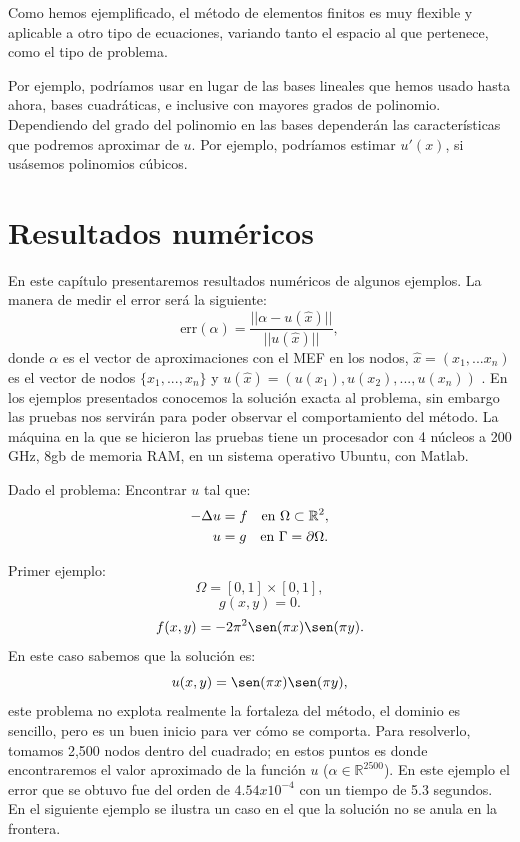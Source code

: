 \documentclass[12pt,spanish,oneside]{book}
\theoremstyle{plain}
\numberwithin{equation}{chapter}
\theoremstyle{definition}
\theoremstyle{remark}
\newcommand{\re}{\mathbb{R}}
\begin{document}
Como hemos ejemplificado, el método de elementos finitos es muy flexible y aplicable a otro tipo de ecuaciones, variando tanto el espacio al que pertenece, como el tipo de problema. 

Por ejemplo, podríamos usar en lugar de las bases lineales que hemos usado hasta ahora, bases cuadráticas, e inclusive con mayores grados de polinomio. Dependiendo del grado del polinomio en las bases dependerán las características que podremos aproximar de $u$. Por ejemplo, podríamos estimar $u'(x)$, si usásemos polinomios cúbicos. 

\chapter{Resultados numéricos}

En este capítulo presentaremos resultados numéricos de algunos ejemplos. La manera de medir el error será la siguiente: 
\[ \text{err}(\alpha)=\frac{||\alpha - u(\hat{x})||}{||u(\hat{x})||},\]
donde $\alpha$ es el vector de aproximaciones con el MEF en los nodos, $\hat{x}=(x_1,...x_n)$ es el vector de nodos $\lbrace x_1,...,x_n\rbrace$ y $u(\hat{x})=(u(x_1),u(x_2),...,u(x_n))$  . En los ejemplos presentados conocemos la solución exacta al problema, sin embargo las pruebas nos servirán para poder observar el comportamiento del método. La máquina en la que se hicieron las pruebas tiene un procesador con 4 núcleos a 200 GHz, 8gb de memoria RAM, en un sistema operativo Ubuntu, con Matlab.  

Dado el problema: Encontrar $u$ tal que: 
\begin{align}
\label{eje1}
-\Delta u &= f \hspace{10 pt} \text{en } \Omega \subset \re^2 ,\\ 
u &=g \hspace{10 pt} \text{en } \Gamma=\partial\Omega. 
\end{align}

Primer ejemplo: 
\[\Omega =[0,1]\times[0,1],\]\[g(x,y)=0.\]\[ f(x,y) = - 2 \pi ^2 \sen(\pi x)\sen(\pi y).\]
En este caso sabemos que la solución es: \[ u(x,y)=\sen(\pi x)\sen(\pi y),\]
este problema no explota realmente la fortaleza del método, el dominio es sencillo, pero es un buen inicio para ver cómo se comporta. Para resolverlo, tomamos 2,500 nodos dentro del cuadrado; en estos puntos es donde encontraremos el valor aproximado de la función $u$ ($\alpha\in \re^{2500}$). En este ejemplo el error que se obtuvo fue del orden de $4.54x10^{-4}$ con un tiempo de 5.3 segundos. En el siguiente ejemplo se ilustra un caso en el que la solución no se anula en la frontera.
\end{document}
